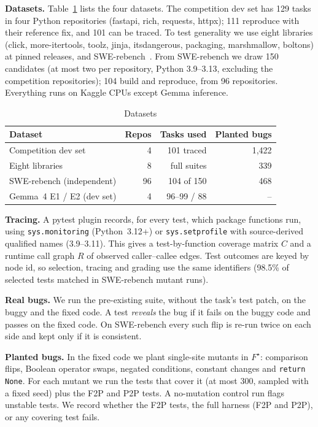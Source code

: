 \documentclass[conference]{IEEEtran}
\newcommand{\Fs}{F^{\star}}
\begin{document}
\textbf{Datasets.} Table~\ref{tab:data} lists the four datasets. The competition dev set has 129 tasks in four Python repositories (fastapi, rich, requests, httpx); 111 reproduce with their reference fix, and 101 can be traced. To test generality we use eight libraries (click, more-itertools, toolz, jinja, itsdangerous, packaging, marshmallow, boltons) at pinned releases, and SWE-rebench~\cite{badertdinov2025swerebench}. From SWE-rebench we draw 150 candidates (at most two per repository, Python 3.9--3.13, excluding the competition repositories); 104 build and reproduce, from 96 repositories. Everything runs on Kaggle CPUs except Gemma inference.

\begin{table}[t]
\caption{Datasets}
\label{tab:data}
\centering\scriptsize
\begin{tabular}{@{}lrrr@{}}
\toprule
Dataset & Repos & Tasks used & Planted bugs \\
\midrule
Competition dev set & 4 & 101 traced & 1,422 \\
Eight libraries & 8 & full suites & 339 \\
SWE-rebench (independent) & 96 & 104 of 150 & 468 \\
Gemma~4 E1 / E2 (dev set) & 4 & 96--99 / 88 & -- \\
\bottomrule
\end{tabular}
\end{table}

\textbf{Tracing.} A pytest plugin records, for every test, which package functions run, using \texttt{sys.monitoring} (Python~3.12+) or \texttt{sys.setprofile} with source-derived qualified names (3.9--3.11). This gives a test-by-function coverage matrix $C$ and a runtime call graph $R$ of observed caller--callee edges. Test outcomes are keyed by node id, so selection, tracing and grading use the same identifiers (98.5\% of selected tests matched in SWE-rebench mutant runs).

\textbf{Real bugs.} We run the pre-existing suite, without the task's test patch, on the buggy and the fixed code. A test \emph{reveals} the bug if it fails on the buggy code and passes on the fixed code. On SWE-rebench every such flip is re-run twice on each side and kept only if it is consistent.

\textbf{Planted bugs.} In the fixed code we plant single-site mutants in $\Fs$: comparison flips, Boolean operator swaps, negated conditions, constant changes and \texttt{return None}. For each mutant we run the tests that cover it (at most 300, sampled with a fixed seed) plus the F2P and P2P tests. A no-mutation control run flags unstable tests. We record whether the F2P tests, the full harness (F2P and P2P), or any covering test fails.
\end{document}
